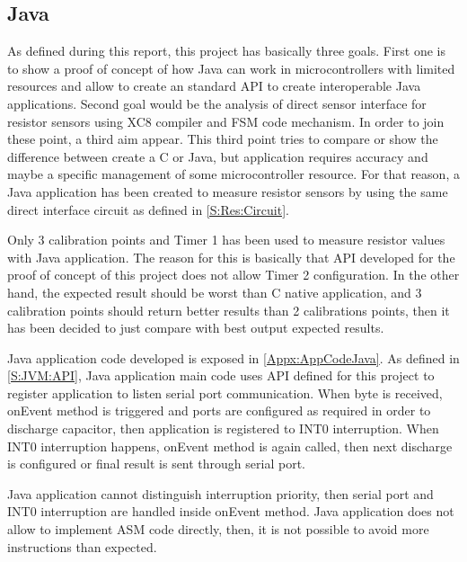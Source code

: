 \subsection{Java}\label{SS:Res:Code:Java}
As defined during this report, this project has basically three goals. First one is to show a proof of concept of how Java can work in microcontrollers with limited resources and allow to create an standard API to create interoperable Java applications. Second goal would be the analysis of direct sensor interface for resistor sensors using XC8 compiler and FSM code mechanism. In order to join these point, a third aim appear. This third point tries to compare or show the difference between create a C or Java, but application requires accuracy and maybe a specific management of some microcontroller resource. For that reason, a Java application has been created to measure resistor sensors by using the same direct interface circuit as defined in \ref{S:Res:Circuit}.

Only 3 calibration points and Timer 1 has been used to measure resistor values with Java application. The reason for this is basically that API developed for the proof of concept of this project does not allow Timer 2 configuration. In the other hand, the expected result should be worst than C native application, and 3 calibration points should return better results than 2 calibrations points, then it has been decided to just compare with best output expected results.

Java application code developed is exposed in \ref{Appx:AppCodeJava}. As defined in \ref{S:JVM:API}, Java application main code uses API defined for this project to register application to listen serial port communication. When byte is received, onEvent method is triggered and ports are configured as required in order to discharge capacitor, then application is registered to INT0 interruption. When INT0 interruption happens, onEvent method is again called, then next discharge is configured or final result is sent through serial port.

Java application cannot distinguish interruption priority, then serial port and INT0 interruption are handled inside onEvent method. Java application does not allow to implement ASM code directly, then, it is not possible to avoid more instructions than expected.